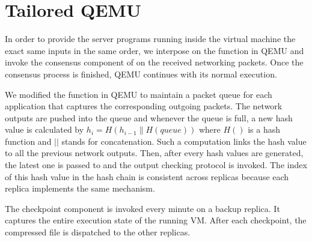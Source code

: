 \section{Tailored QEMU} \label{sec:qemu}

In order to provide the server programs running inside the virtual machine the exact same 
inputs in the same order, we interpose on the \tapsend function in QEMU and invoke the 
\paxos consensus component of \smrsystem on the received networking packets. Once the 
consensus process is finished, QEMU continues with its normal execution. 

We modified the \taprecv function in QEMU to maintain a packet queue for each application 
that captures the corresponding outgoing packets. The network outputs are pushed into the 
queue and whenever the queue is full, a new hash value is calculated by 
$h_i=H(h_{i-1}\|H(queue))$ where $H()$ is a hash function and $||$ stands for concatenation. 
Such a computation links the hash value to all the previous network outputs. Then, after every 
\thashcomp hash values are generated, the latest one is passed to \smrsystem and the output 
checking protocol is invoked. The index of this hash value in the hash chain is 
consistent across replicas because each replica implements the same mechanism. 


The checkpoint component is invoked every minute on a backup replica. It captures the entire 
execution state of the running VM. After each checkpoint, the compressed file is dispatched 
to the other replicas. 
